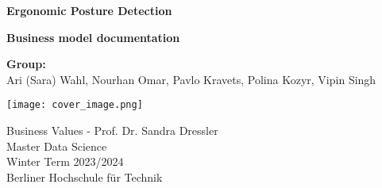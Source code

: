 \begin{titlepage}
    \begin{center}
        \vspace*{1cm}
        
        \Huge
        \textbf{Ergonomic Posture Detection}
        
        \vspace{0.5cm}
        \LARGE
        \textbf{Business model documentation}
        
        \vspace{1.5cm}
        \Large
        \textbf{Group:}\\
        Ari (Sara) Wahl, Nourhan Omar, Pavlo Kravets, Polina Kozyr, Vipin Singh
        
        \vfill
        \texttt{[image: cover\_image.png]}
        \vfill
        
        \Large
        Business Values - Prof. Dr. Sandra Dressler\\
        Master Data Science\\
        Winter Term 2023/2024\\
        Berliner Hochschule für Technik
        
    \end{center}
\end{titlepage}